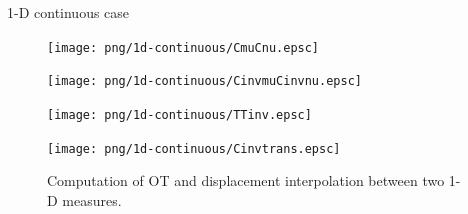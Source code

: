 \begin{frame}{1-D continuous case}
    \vspace{-1.2em}
    \begin{figure}
        \captionsetup{font=scriptsize}
        \begin{minipage}[c]{0.24\linewidth}
            \vspace{0pt}
            \centering
            \texttt{[image: png/1d-continuous/CmuCnu.epsc]}
            \caption*{$(\mathcal{C}_\mu,\mathcal{C}_\nu)$}
        \end{minipage}
        \hfill
        \begin{minipage}[c]{0.24\linewidth}
            \vspace{0pt}
            \centering
            \texttt{[image: png/1d-continuous/CinvmuCinvnu.epsc]}
            \caption*{$(\mathcal{C}^{-1}_\mu,\mathcal{C}^{-1}_\nu)$}
        \end{minipage}
        \hfill
        \begin{minipage}[c]{0.24\linewidth}
            \vspace{0pt}
            \centering
            \texttt{[image: png/1d-continuous/TTinv.epsc]}
            \caption*{$(T,T^{-1})$}
        \end{minipage}
        \hfill
        \begin{minipage}[c]{0.24\linewidth}
            \vspace{0pt}
            \centering
            \texttt{[image: png/1d-continuous/Cinvtrans.epsc]}
            \caption*{$(1-t)\mathcal{C}^{-1}_\mu+t\mathcal{C}^{-1}_\nu$}
        \end{minipage}

        \vspace{-1em}
        \caption{Computation of OT and displacement interpolation between two 1-D measures.}
    \end{figure}
    
\end{frame}

